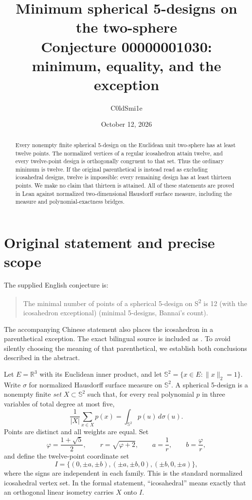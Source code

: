 \documentclass[11pt]{article}
\title{Minimum spherical 5-designs on the two-sphere\\\large Conjecture 00000001030: minimum, equality, and the exception}
\author{C0ldSmi1e}
\date{October 12, 2026}
\newcommand{\R}{\mathbb R}
\newcommand{\Sph}{\mathbb S^2}
\newcommand{\code}[1]{\texttt{\detokenize{#1}}}
\begin{document}
\maketitle
\begin{abstract}
Every nonempty finite spherical 5-design on the Euclidean unit two-sphere has at least twelve points. The normalized vertices of a regular icosahedron attain twelve, and every twelve-point design is orthogonally congruent to that set. Thus the ordinary minimum is twelve. If the original parenthetical is instead read as excluding icosahedral designs, twelve is impossible: every remaining design has at least thirteen points. We make no claim that thirteen is attained. All of these statements are proved in Lean against normalized two-dimensional Hausdorff surface measure, including the measure and polynomial-exactness bridges.
\end{abstract}

\section{Original statement and precise scope}
The supplied English conjecture is:
\begin{quote}
The minimal number of points of a spherical 5-design on S\textsuperscript{2} is 12 (with the icosahedron exceptional) (minimal 5-designs, Bannai's count).
\end{quote}
The accompanying Chinese statement also places the icosahedron in a parenthetical exception. The exact bilingual source is included as \code{conjecture.md}. To avoid silently choosing the meaning of that parenthetical, we establish both conclusions described in the abstract.

Let $E=\R^3$ with its Euclidean inner product, and let
$\Sph=\{x\in E:\|x\|_2=1\}$. Write $\sigma$ for normalized Hausdorff surface measure on $\Sph$. A spherical 5-design is a nonempty finite \emph{set} $X\subset\Sph$ such that, for every real polynomial $p$ in three variables of total degree at most five,
\begin{equation}\label{eq:design}
 \frac1{|X|}\sum_{x\in X}p(x)=\int_{\Sph}p(u)\,d\sigma(u).
\end{equation}
Points are distinct and all weights are equal. Set
\[
 \varphi=\frac{1+\sqrt5}{2},\qquad r=\sqrt{\varphi+2},\qquad
 a=\frac1r,\qquad b=\frac\varphi r,
\]
and define the twelve-point coordinate set
\begin{equation}\label{eq:ico}
 I=\{(0,\pm a,\pm b),(\pm a,\pm b,0),(\pm b,0,\pm a)\},
\end{equation}
where the signs are independent in each family. This is the standard normalized icosahedral vertex set. In the formal statement, ``icosahedral'' means exactly that an orthogonal linear isometry carries $X$ onto $I$.
\end{document}
